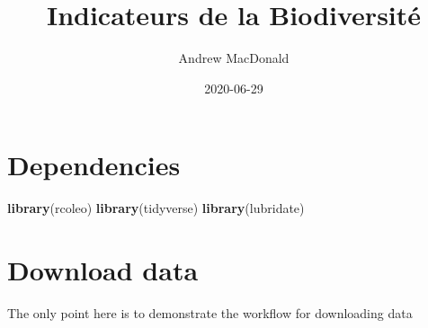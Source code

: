 \documentclass[
]{book}
\title{Indicateurs de la Biodiversité}
\author{Andrew MacDonald}
\date{2020-06-29}
\newenvironment{Shaded}{\begin{snugshade}}{\end{snugshade}}
\newcommand{\KeywordTok}[1]{\textcolor[rgb]{0.13,0.29,0.53}{\textbf{#1}}}
\newcommand{\NormalTok}[1]{#1}
\begin{document}
\maketitle

{
\setcounter{tocdepth}{1}
\tableofcontents
}
\hypertarget{dependencies}{%
\chapter{Dependencies}\label{dependencies}}

\begin{Shaded}
\begin{Highlighting}[]
\KeywordTok{library}\NormalTok{(rcoleo)}
\KeywordTok{library}\NormalTok{(tidyverse)}
\KeywordTok{library}\NormalTok{(lubridate)}
\end{Highlighting}
\end{Shaded}

\hypertarget{dl}{%
\chapter{Download data}\label{dl}}

The only point here is to demonstrate the workflow for downloading data
\end{document}
